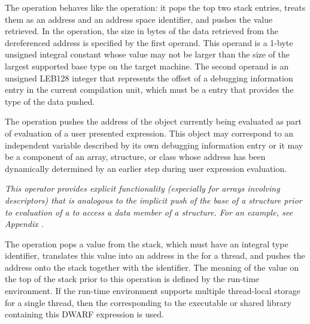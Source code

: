 \begin{enumerate}[1. ]
\itembfnl{\DWOPxdereftypeTARG}
The \DWOPxdereftypeNAME{} operation behaves like the \DWOPxderefsize{}
operation: it pops the top two stack entries, treats them as an address and
an address space identifier, and pushes the value retrieved. In the
\DWOPxdereftypeNAME{} operation, the size in bytes of the data retrieved from
the dereferenced address is specified by the first operand. This operand is
a 1-byte unsigned integral constant whose value may not be larger than the
size of the largest supported base type on the target machine. The second
operand is an unsigned LEB128 integer that represents the offset of a
debugging information entry in the current compilation unit, which must be a
\DWTAGbasetype{} entry that provides the type of the data pushed.

\itembfnl{\DWOPpushobjectaddressTARG}
The \DWOPpushobjectaddressNAME{}
operation pushes the address
of the object currently being evaluated as part of evaluation
of a user presented expression. This object may correspond
to an independent variable described by its own debugging
information entry or it may be a component of an array,
structure, or class whose address has been dynamically
determined by an earlier step during user expression
evaluation.

\textit{This operator provides explicit functionality
(especially for arrays involving descriptors) that is analogous
to the implicit push of the base 
of a structure prior to evaluation of a 
\DWATdatamemberlocation{} 
to access a data member of a structure. For an example, see 
Appendix .}

\itembfnl{\DWOPformtlsaddressTARG}
The \DWOPformtlsaddressNAME{} 
operation pops a value from the stack, which must have an 
integral type identifier, translates this
value into an address in the 
for a thread, and pushes the address 
onto the stack together with the \specialaddresstype{} identifier. 
The meaning of the value on the top of the stack prior to this 
operation is defined by the run-time environment.  If the run-time 
environment supports multiple thread-local storage 
 for a single thread, then the  
corresponding to the executable or shared 
library containing this DWARF expression is used.
   

\end{enumerate}
